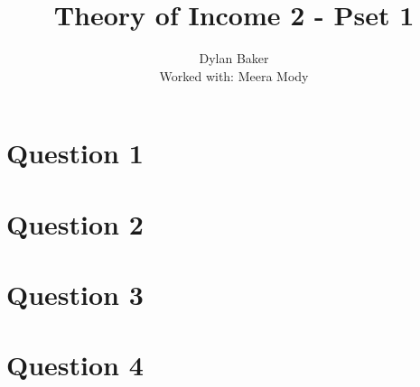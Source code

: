 \documentclass[10pt]{article}
\title{Theory of Income 2 - Pset 1}
\author{Dylan Baker
\\ Worked with: Meera Mody}
\date{}
\begin{document}
\maketitle

\tableofcontents

\section{Question 1}


\pagebreak

\section{Question 2}


\pagebreak

\section{Question 3}


\pagebreak

\section{Question 4}

\end{document}
